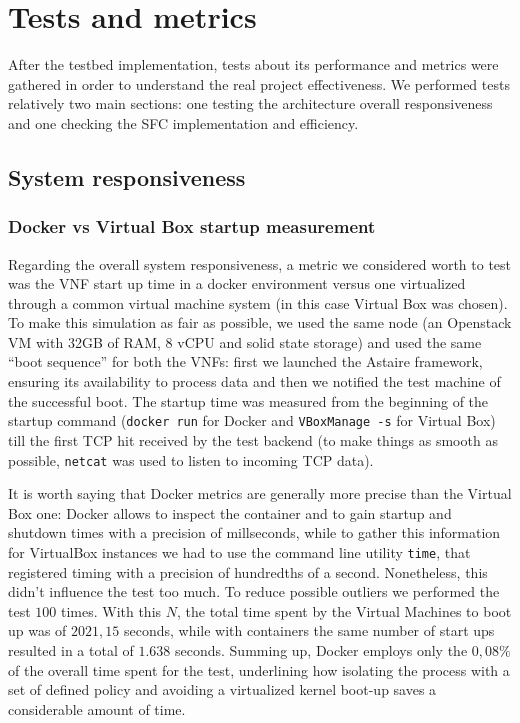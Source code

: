 \chapter{Tests and metrics}

After the testbed implementation, tests about its performance and metrics were
gathered in order to understand the real project effectiveness. We performed
tests relatively two main sections: one testing the architecture overall
responsiveness and one checking the SFC implementation and efficiency.

\section{System responsiveness}

\subsection{Docker vs Virtual Box startup measurement}

Regarding the overall system responsiveness, a metric we considered worth to 
test was the VNF start up time in a docker environment versus one virtualized 
through a common virtual machine system (in this case Virtual Box was chosen). 
To make this simulation as fair as possible, we used the same node (an 
Openstack VM with 32GB of RAM, 8 vCPU and solid state storage) and used the same 
``boot sequence'' for both the VNFs: first we launched the Astaire framework, 
ensuring its availability to process data and then we notified the test 
machine of the successful boot. The startup time was measured from the 
beginning of the startup command (\verb!docker run! for Docker and 
\verb!VBoxManage -s! for Virtual Box) till the first TCP hit received by the 
test backend (to make things as smooth as possible, \verb!netcat! was used 
to listen to incoming TCP data).

It is worth saying that Docker metrics are generally more precise than the
Virtual Box one: Docker allows to inspect the container and to gain startup and
shutdown times with a precision of millseconds, while to gather this information
for VirtualBox instances we had to use the command line utility \verb!time!,
that registered timing with a precision of hundredths of a second. Nonetheless,
this didn't influence the test too much. To reduce possible outliers we performed
the test $100$ times. With this $N$, the total time spent by the Virtual
Machines to boot up was of $2021,15$ seconds, while with containers the same
number of start ups resulted in a total of $1.638$ seconds. Summing up, Docker
employs only the $0,08\%$ of the overall time spent for the test, underlining
how isolating the process with a set of defined policy and avoiding a
virtualized kernel boot-up saves a considerable amount of time.

